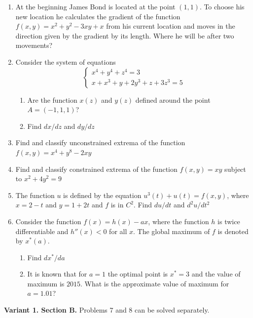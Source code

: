\documentclass[12pt]{article} %
\theoremstyle{definition} %
\begin{document}
\begin{enumerate}

\item At the beginning James Bond is located at the point $(1, 1)$. To choose his new location he calculates the gradient of the function $f(x,y)=x^2+y^2 - 3xy+x$ from his current location and moves in the direction given by the gradient by its length. Where he will be after two movements?

\item Consider the system of equations
\[
\begin{cases}
x^4 + y^4 + z^4 = 3 \\
x + x^3 + y + 2y^3 + z + 3z^3 = 5
\end{cases}
\]

\begin{enumerate}
\item Are the function $x(z)$ and $y(z)$ defined around the point $A=(-1,1,1)$?
\item Find $dx/dz$ and $dy/dz$
\end{enumerate}


\item Find and classify unconstrained extrema of the function $f(x,y)=x^4 + y^8 - 2xy$

\item Find and classify constrained extrema of the function $f(x, y) =  xy$ subject to $x^2 + 4y^2= 9$


\item The function $u$ is defined by the equation $u^3(t) + u(t) = f(x,y)$, where $x=2-t$ and $y=1+2t$ and $f$ is in $C^2$. Find $du/dt$ and $d^2 u/dt^2$


\item Consider the function $f(x)=h(x)-ax$, where the function $h$ is twice differentiable and $h''(x)<0$ for all $x$. The global maximum of $f$ is denoted by $x^*(a)$.
\begin{enumerate}
\item Find $dx^*/da$
\item It is known that for $a=1$ the optimal point is $x^*=3$ and the value of maximum is $2015$. What is the approximate value of maximum for $a=1.01$?
\end{enumerate}

\end{enumerate}



\textbf{Variant 1. Section B.} Problems 7 and 8 can be solved separately.
\end{document}
